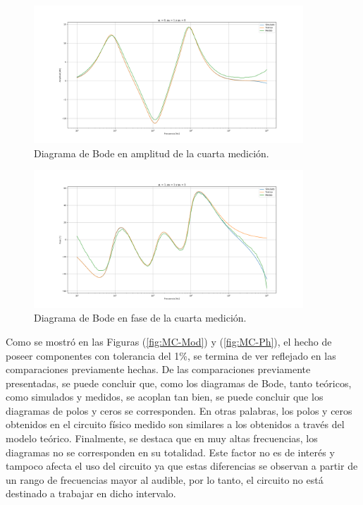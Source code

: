 \begin{figure}[H]	
	\centering
	\includegraphics[width=0.9\textwidth]{Imagenes/CBodes-Mod-1.png}
	\caption{Diagrama de Bode en amplitud de la cuarta medición.}
	\label{fig:CBodes-Mod-4}
\end{figure}
\begin{figure}[H]	
	\centering
	\includegraphics[width=0.9\textwidth]{Imagenes/CBodes-Ph-4.png}
	\caption{Diagrama de Bode en fase de la cuarta medición.}
	\label{fig:CBodes-Ph-4}
\end{figure}

Como se mostró en las Figuras (\ref{fig:MC-Mod}) y (\ref{fig:MC-Ph}), el hecho de poseer componentes con tolerancia del 1\%, se termina de ver reflejado en las comparaciones previamente hechas. De las comparaciones previamente presentadas, se puede concluir que, como los diagramas de Bode, tanto teóricos, como simulados y medidos, se acoplan tan bien, se puede concluir que los diagramas de polos y ceros se corresponden. En otras palabras, los polos y ceros obtenidos en el circuito físico medido son similares a los obtenidos a través del modelo teórico. Finalmente, se destaca que en muy altas frecuencias, los diagramas no se corresponden en su totalidad. Este factor no es de interés y tampoco afecta el uso del circuito ya que estas diferencias se observan a partir de un rango de frecuencias mayor al audible, por lo tanto, el circuito no está destinado a trabajar en dicho intervalo.


